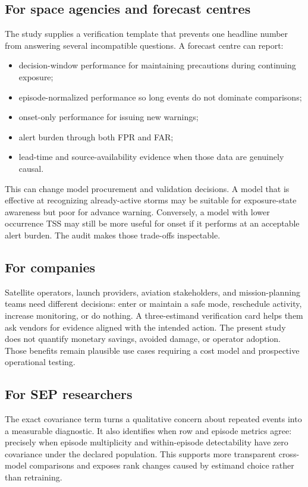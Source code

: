 \documentclass[11pt]{article}
\begin{document}
\subsection{For space agencies and forecast centres}

The study supplies a verification template that prevents one headline number from answering several incompatible questions. A forecast centre can report:

\begin{itemize}
\item decision-window performance for maintaining precautions during continuing exposure;
\item episode-normalized performance so long events do not dominate comparisons;
\item onset-only performance for issuing new warnings;
\item alert burden through both FPR and FAR;
\item lead-time and source-availability evidence when those data are genuinely causal.
\end{itemize}

This can change model procurement and validation decisions. A model that is effective at recognizing already-active storms may be suitable for exposure-state awareness but poor for advance warning. Conversely, a model with lower occurrence TSS may still be more useful for onset if it performs at an acceptable alert burden. The audit makes those trade-offs inspectable.

\subsection{For companies}

Satellite operators, launch providers, aviation stakeholders, and mission-planning teams need different decisions: enter or maintain a safe mode, reschedule activity, increase monitoring, or do nothing. A three-estimand verification card helps them ask vendors for evidence aligned with the intended action. The present study does not quantify monetary savings, avoided damage, or operator adoption. Those benefits remain plausible use cases requiring a cost model and prospective operational testing.

\subsection{For SEP researchers}

The exact covariance term turns a qualitative concern about repeated events into a measurable diagnostic. It also identifies when row and episode metrics agree: precisely when episode multiplicity and within-episode detectability have zero covariance under the declared population. This supports more transparent cross-model comparisons and exposes rank changes caused by estimand choice rather than retraining.
\end{document}
